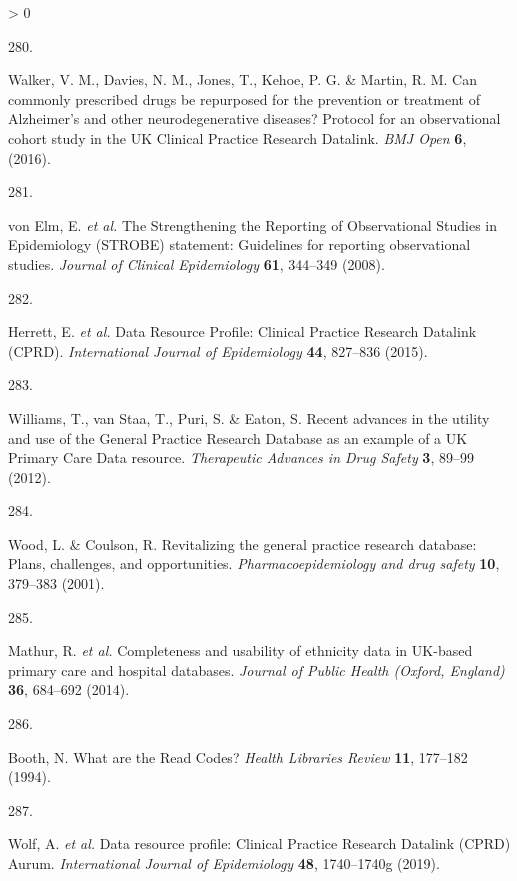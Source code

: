 \documentclass[a4paper, twoside]{templates/ociamthesis}
\newlength{\cslhangindent}
\newlength{\csllabelwidth}
\newenvironment{CSLReferences}[3] %
 {%
  \setlength{\parindent}{0pt}
  \ifodd #1 \everypar{\setlength{\hangindent}{\cslhangindent}}\ignorespaces\fi
  \ifnum #2 > 0
  \setlength{\parskip}{#2\baselineskip}
  \fi
 }%
 {}
\newcommand{\CSLLeftMargin}[1]{\parbox[t]{\maxof{\widthof{#1}}{\csllabelwidth}}{#1}}
\newcommand{\CSLRightInline}[1]{\parbox[t]{\linewidth - \csllabelwidth}{#1}}
\begin{document}
\begin{CSLReferences}{0}{0}
\leavevmode\hypertarget{ref-walker2016}{}%
\CSLLeftMargin{280. }
\CSLRightInline{Walker, V. M., Davies, N. M., Jones, T., Kehoe, P. G. \& Martin, R. M. Can commonly prescribed drugs be repurposed for the prevention or treatment of {Alzheimer}'s and other neurodegenerative diseases? Protocol for an observational cohort study in the {UK Clinical Practice Research Datalink}. \emph{BMJ Open} \textbf{6}, (2016).}

\leavevmode\hypertarget{ref-vonelm2008}{}%
\CSLLeftMargin{281. }
\CSLRightInline{von Elm, E. \emph{et al.} The {Strengthening} the {Reporting} of {Observational Studies} in {Epidemiology} ({STROBE}) statement: Guidelines for reporting observational studies. \emph{Journal of Clinical Epidemiology} \textbf{61}, 344--349 (2008).}

\leavevmode\hypertarget{ref-herrett2015}{}%
\CSLLeftMargin{282. }
\CSLRightInline{Herrett, E. \emph{et al.} Data {Resource Profile}: Clinical {Practice Research Datalink} ({CPRD}). \emph{International Journal of Epidemiology} \textbf{44}, 827--836 (2015).}

\leavevmode\hypertarget{ref-williams2012}{}%
\CSLLeftMargin{283. }
\CSLRightInline{Williams, T., van Staa, T., Puri, S. \& Eaton, S. Recent advances in the utility and use of the {General Practice Research Database} as an example of a {UK Primary Care Data} resource. \emph{Therapeutic Advances in Drug Safety} \textbf{3}, 89--99 (2012).}

\leavevmode\hypertarget{ref-wood2001revitalizing}{}%
\CSLLeftMargin{284. }
\CSLRightInline{Wood, L. \& Coulson, R. Revitalizing the general practice research database: Plans, challenges, and opportunities. \emph{Pharmacoepidemiology and drug safety} \textbf{10}, 379--383 (2001).}

\leavevmode\hypertarget{ref-mathur2014}{}%
\CSLLeftMargin{285. }
\CSLRightInline{Mathur, R. \emph{et al.} Completeness and usability of ethnicity data in {UK}-based primary care and hospital databases. \emph{Journal of Public Health (Oxford, England)} \textbf{36}, 684--692 (2014).}

\leavevmode\hypertarget{ref-booth1994}{}%
\CSLLeftMargin{286. }
\CSLRightInline{Booth, N. What are the {Read Codes}? \emph{Health Libraries Review} \textbf{11}, 177--182 (1994).}

\leavevmode\hypertarget{ref-wolf2019}{}%
\CSLLeftMargin{287. }
\CSLRightInline{Wolf, A. \emph{et al.} Data resource profile: Clinical {Practice Research Datalink} ({CPRD}) {Aurum}. \emph{International Journal of Epidemiology} \textbf{48}, 1740--1740g (2019).}


\end{CSLReferences}
\end{document}
